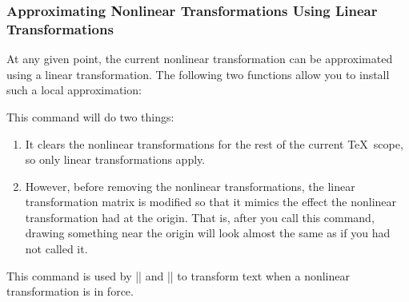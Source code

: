 \subsubsection{Approximating Nonlinear Transformations Using Linear Transformations}

At any given point, the current nonlinear transformation can be approximated
using a linear transformation. The following two functions allow you to install
such a local approximation:

\begin{command}{\pgfapproximatenonlineartransformation}
    This command will do two things:
    \begin{enumerate}
        \item It clears the nonlinear transformations for the rest of the
            current \TeX\ scope, so only linear transformations apply.
        \item However, before removing the nonlinear transformations, the
            linear transformation matrix is modified so that it mimics the
            effect the nonlinear transformation had at the origin. That is,
            after you call this command, drawing something near the origin will
            look almost the same as if you had not called it.
    \end{enumerate}
\begin{codeexample}[]
\end{codeexample}
    This command is used by |\pgftext| and |\pgfnode| to transform text when a
    nonlinear transformation is in force.
\end{command}

